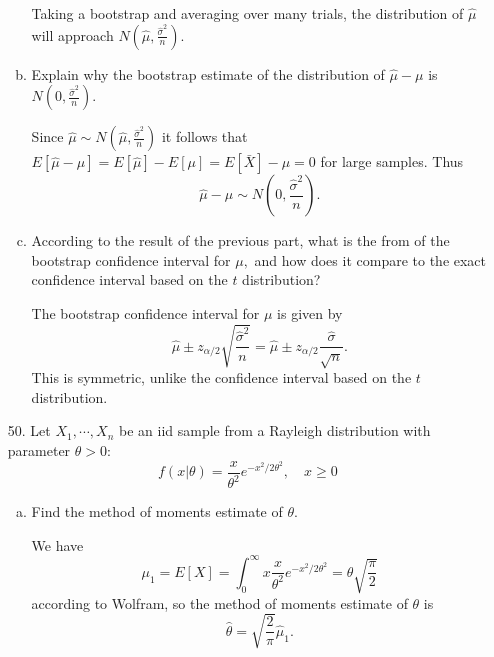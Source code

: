 \documentclass{article}
\begin{document}
\begin{itemize}
\begin{enumerate}[a.]
\begin{answer*}
					Taking a bootstrap and averaging over many trials, the distribution of $\hat{\mu}$ will approach $N\left( \hat{\mu}, \frac{\hat{\sigma}^2}{n} \right).$
				\end{answer*}

			\item Explain why the bootstrap estimate of the distribution of $\hat{\mu}-\mu$ is $N\left( 0, \frac{\hat{\sigma}^2}{n} \right).$
				\begin{answer*}
					Since $\hat{\mu}\sim N\left( \hat{\mu}, \frac{\hat{\sigma}^2}{n} \right)$ it follows that $E[\hat{\mu}-\mu]=E[\hat{\mu}]-E[\mu]=E\left[ \bar{X} \right]-\mu=0$ for large samples. Thus \[\hat{\mu}-\mu\sim N\left( 0, \frac{\hat{\sigma}^2}{n} \right).\]
				\end{answer*}

			\item According to the result of the previous part, what is the from of the bootstrap confidence interval for $\mu,$ and how does it compare to the exact confidence interval based on the $t$ distribution?
				\begin{answer*}
					The bootstrap confidence interval for $\mu$ is given by \[\hat{\mu}\pm z_{\alpha/2} \sqrt{\frac{\hat{\sigma}^2}{n}}=\hat{\mu}\pm z_{\alpha/2}\frac{\hat{\sigma}}{\sqrt{n}}.\] This is symmetric, unlike the confidence interval based on the $t$ distribution.
				\end{answer*}
				
		\end{enumerate}

	\item[50.] Let $X_1,\cdots, X_n$ be an iid sample from a Rayleigh distribution with parameter $\theta>0$:\[f(x|\theta)=\frac{x}{\theta^2}e^{-x^2/2\theta^2}, \quad x\ge 0\]

		\begin{enumerate}[a.]
			\item Find the method of moments estimate of $\theta.$
				\begin{soln}
					We have \[\mu_1=E[X] = \int_0^\infty x\frac{x}{\theta^2}e^{-x^2/2\theta^2} = \theta\sqrt{\frac{\pi}{2}}\] according to Wolfram, so the method of moments estimate of $\theta$ is \[\hat{\theta}=\sqrt{\frac{2}{\pi}}\hat{\mu}_1.\]

				\end{soln}


\end{enumerate}
\end{itemize}
\end{document}
